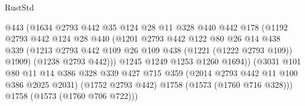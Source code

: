 \begin{lexlean}{RustStd}
\begin{coremodule}
                                  @443
                                  (@1634
                                    @2793
                                    @442
                                    @35
                                    @124
                                    @28
                                    @11
                                    @328
                                    @440
                                    @442
                                    @178
                                    (@1192
                                      @2793
                                      @442
                                      @124
                                      @28
                                      @440
                                      (@1201
                                        @2793
                                        @442
                                        @122
                                        @80
                                        @26
                                        @14
                                        @438
                                        @339
                                        (@1213
                                          @2793
                                          @442
                                          @109
                                          @26
                                          @109
                                          @438
                                          (@1221 (@1222 @2793 @109))
                                          @1909)
                                        (@1238 @2793 @442)))
                                    @1245
                                    @1249
                                    @1253
                                    @1260
                                    @1694))
                                (@3031
                                  @101
                                  @80
                                  @11
                                  @14
                                  @386
                                  @328
                                  @339
                                  @427
                                  @715
                                  @359
                                  (@2014 @2793 @442 @11 @100 @386 @2025 @2031)
                                  (@1752 @2793 @442)
                                  @1758
                                  (@1573 (@1760 @716 @328)))
                                @1758
                                (@1573 (@1760 @706 @722)))

\end{coremodule}
\end{lexlean}
